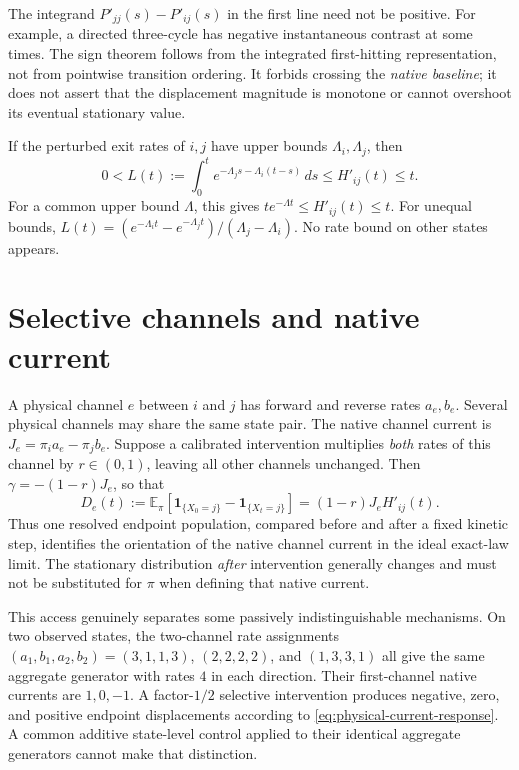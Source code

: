 The integrand $P'_{jj}(s)-P'_{ij}(s)$ in the first line need not be
positive.  For example, a directed three-cycle has negative instantaneous
contrast at some times.  The sign theorem follows from the integrated
first-hitting representation, not from pointwise transition ordering.
It forbids crossing the \emph{native baseline}; it does not assert that
the displacement magnitude is monotone or cannot overshoot its eventual
stationary value.

\begin{corollary}
\label{cor:physical-local-bounds}
If the perturbed exit rates of $i,j$ have upper bounds
$\Lambda_i,\Lambda_j$, then
\[
 0<L(t):=\int_0^t
 e^{-\Lambda_j s-\Lambda_i(t-s)}\,ds
 \le H'_{ij}(t)\le t.
\]
For a common upper bound $\Lambda$, this gives
$t e^{-\Lambda t}\le H'_{ij}(t)\le t$.
For unequal bounds,
$L(t)=(e^{-\Lambda_i t}-e^{-\Lambda_j t})/(\Lambda_j-\Lambda_i)$.
No rate bound on other states appears.
\end{corollary}

\section{Selective channels and native current}

A physical channel $e$ between $i$ and $j$ has forward and reverse rates
$a_e,b_e$.  Several physical channels may share the same state pair.
The native channel current is
$J_e=\pi_i a_e-\pi_j b_e$.  Suppose a calibrated intervention multiplies
\emph{both} rates of this channel by $r\in(0,1)$, leaving all other
channels unchanged.  Then $\gamma=-(1-r)J_e$, so that
\begin{equation}
 D_e(t):=\mathbb E_\pi[
 \mathbf 1_{\{X_0=j\}}-\mathbf 1_{\{X_t=j\}}]
 =(1-r)J_e H'_{ij}(t).
 \label{eq:physical-current-response}
\end{equation}
Thus one resolved endpoint population, compared before and after a
fixed kinetic step, identifies the orientation of the native channel
current in the ideal exact-law limit.  The stationary distribution
\emph{after} intervention generally changes and must not be substituted
for $\pi$ when defining that native current.

This access genuinely separates some passively indistinguishable
mechanisms.  On two observed states, the two-channel rate assignments
$(a_1,b_1,a_2,b_2)=(3,1,1,3)$, $(2,2,2,2)$, and $(1,3,3,1)$ all give
the same aggregate generator with rates $4$ in each direction.  Their
first-channel native currents are $1,0,-1$.  A factor-$1/2$ selective
intervention produces negative, zero, and positive endpoint displacements
according to \eqref{eq:physical-current-response}.  A common additive
state-level control applied to their identical aggregate generators
cannot make that distinction.


